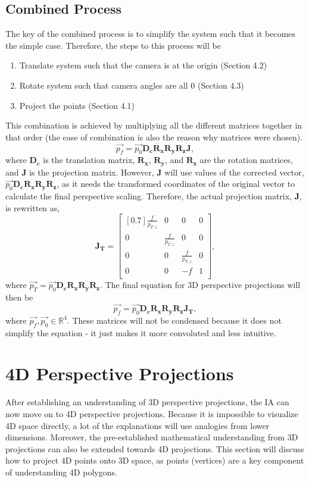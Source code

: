 \documentclass[12pt, letterpaper]{article}
\begin{document}
\subsection{Combined Process}
The key of the combined process is to simplify the system such that it becomes the simple case. Therefore, the steps to this process will be
\begin{enumerate}
  \item Translate system such that the camera is at the origin (Section 4.2)
  \item Rotate system such that camera angles are all 0 (Section 4.3)
  \item Project the points (Section 4.1)
\end{enumerate}
This combination is achieved by multiplying all the different matrices together in that order (the ease of combination is also the reason why matrices were chosen).
\begin{equation*}
    \vec{p_f} = \vec{p_0} \mathbf{D_c}\mathbf{R_x}\mathbf{R_y}\mathbf{R_z}\mathbf{J},
\end{equation*}
where $\mathbf{D_c}$ is the translation matrix, $\mathbf{R_x}$, $\mathbf{R_y}$, and $\mathbf{R_z}$ are the rotation matrices, and $\mathbf{J}$ is the projection matrix. However, $\mathbf{J}$ will use values of the corrected vector, $\vec{p_0}\mathbf{D_c}\mathbf{R_x}\mathbf{R_y}\mathbf{R_z}$, as it needs the transformed coordinates of the original vector to calculate the final perspective scaling. Therefore, the actual projection matrix, $\mathbf{J}$, is rewritten as,
$$\mathbf{J_T} =\begin{bmatrix}[0.7] \frac{f}{p_{T, z}} & 0 & 0 & 0\\ 0 & \frac{f}{p_{T, z}} & 0 & 0 \\ 0 & 0 & \frac{f}{p_{T, z}} & 0 \\ 0 & 0 & -f & 1\\   \end{bmatrix},$$
where $\vec{p_T} = \vec{p_0}\mathbf{D_c}\mathbf{R_x}\mathbf{R_y}\mathbf{R_z}$. The final equation for 3D perspective projections will then be
\begin{equation}
    \vec{p_f} = \vec{p_0} \mathbf{D_c}\mathbf{R_x}\mathbf{R_y}\mathbf{R_z}\mathbf{J_T},
\end{equation}
where $\vec{p_f}, \vec{p_0} \in \mathbb{R}^4$. These matrices will not be condensed because it does not simplify the equation - it just makes it more convoluted and less intuitive. 

\section{4D Perspective Projections}
After establishing an understanding of 3D perspective projections, the IA can now move on to 4D perspective projections. Because it is impossible to visualize 4D space directly, a lot of the explanations will use analogies from lower dimensions. Moreover, the pre-established mathematical understanding from 3D projections can also be extended towards 4D projections. This section will discuss how to project 4D points onto 3D space, as points (vertices) are a key component of understanding 4D polygons.
\end{document}
